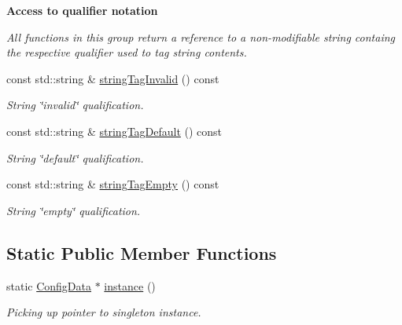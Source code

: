 \begin{Indent}{\bf Access to qualifier notation}\par
{\em All functions in this group return a reference to a non-modifiable string containg the respective qualifier used to tag string contents. }\begin{CompactItemize}
\item 
\hypertarget{classConfiguration_1_1ConfigData_7570701c6c75028a72b3f8bf1fec3868}{
const std::string \& \hyperlink{classConfiguration_1_1ConfigData_7570701c6c75028a72b3f8bf1fec3868}{string\-Tag\-Invalid} () const }
\label{classConfiguration_1_1ConfigData_7570701c6c75028a72b3f8bf1fec3868}

\begin{CompactList}\small\item\em String \char`\"{}invalid\char`\"{} qualification. \item\end{CompactList}\item 
\hypertarget{classConfiguration_1_1ConfigData_4e9a827722b897310fa67d04ecb40b04}{
const std::string \& \hyperlink{classConfiguration_1_1ConfigData_4e9a827722b897310fa67d04ecb40b04}{string\-Tag\-Default} () const }
\label{classConfiguration_1_1ConfigData_4e9a827722b897310fa67d04ecb40b04}

\begin{CompactList}\small\item\em String \char`\"{}default\char`\"{} qualification. \item\end{CompactList}\item 
\hypertarget{classConfiguration_1_1ConfigData_066a671d437458cdbaafe686314d604e}{
const std::string \& \hyperlink{classConfiguration_1_1ConfigData_066a671d437458cdbaafe686314d604e}{string\-Tag\-Empty} () const }
\label{classConfiguration_1_1ConfigData_066a671d437458cdbaafe686314d604e}

\begin{CompactList}\small\item\em String \char`\"{}empty\char`\"{} qualification. \item\end{CompactList}\end{CompactItemize}
\end{Indent}
\subsection*{Static Public Member Functions}
\begin{CompactItemize}
\item 
\hypertarget{classConfiguration_1_1ConfigData_359737a1691b374e353c2a037cdda597}{
static \hyperlink{classConfiguration_1_1ConfigData}{Config\-Data} $\ast$ \hyperlink{classConfiguration_1_1ConfigData_359737a1691b374e353c2a037cdda597}{instance} ()}
\label{classConfiguration_1_1ConfigData_359737a1691b374e353c2a037cdda597}

\begin{CompactList}\small\item\em Picking up pointer to singleton instance. \item\end{CompactList}\end{CompactItemize}
